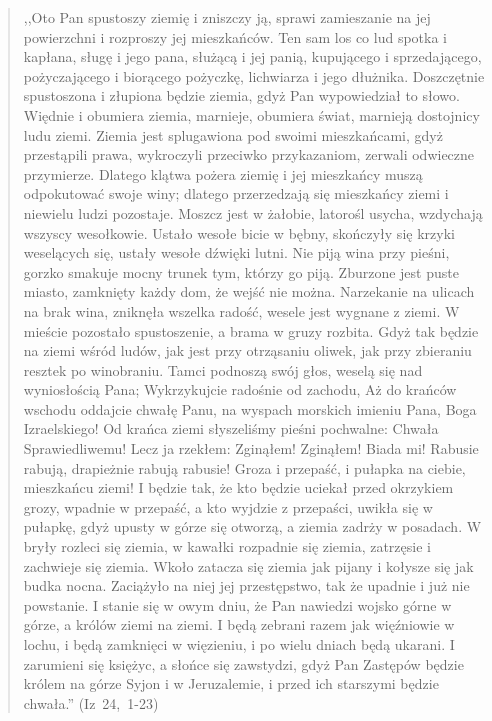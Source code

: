 \documentclass[10pt,a4paper,oneside]{article}
\begin{document}
\begin{quote}
,,Oto Pan spustoszy ziemię i zniszczy ją, sprawi zamieszanie na jej powierzchni i rozproszy jej mieszkańców. Ten sam los co lud spotka i kapłana, sługę i jego pana, służącą i jej panią, kupującego i sprzedającego, pożyczającego i biorącego pożyczkę, lichwiarza i jego dłużnika. Doszczętnie spustoszona i złupiona będzie ziemia, gdyż Pan wypowiedział to słowo. Więdnie i obumiera ziemia, marnieje, obumiera świat, marnieją dostojnicy ludu ziemi. Ziemia jest splugawiona pod swoimi mieszkańcami, gdyż przestąpili prawa, wykroczyli przeciwko przykazaniom, zerwali odwieczne przymierze. Dlatego klątwa pożera ziemię i jej mieszkańcy muszą odpokutować swoje winy; dlatego przerzedzają się mieszkańcy ziemi i niewielu ludzi pozostaje. Moszcz jest w żałobie, latorośl usycha, wzdychają wszyscy wesołkowie. Ustało wesołe bicie w bębny, skończyły się krzyki weselących się, ustały wesołe dźwięki lutni. Nie piją wina przy pieśni, gorzko smakuje mocny trunek tym, którzy go piją. Zburzone jest puste miasto, zamknięty każdy dom, że wejść nie można. Narzekanie na ulicach na brak wina, zniknęła wszelka radość, wesele jest wygnane z ziemi. W mieście pozostało spustoszenie, a brama w gruzy rozbita. Gdyż tak będzie na ziemi wśród ludów, jak jest przy otrząsaniu oliwek, jak przy zbieraniu resztek po winobraniu. Tamci podnoszą swój głos, weselą się nad wyniosłością Pana; Wykrzykujcie radośnie od zachodu, Aż do krańców wschodu oddajcie chwałę Panu, na wyspach morskich imieniu Pana, Boga Izraelskiego! Od krańca ziemi słyszeliśmy pieśni pochwalne: Chwała Sprawiedliwemu! Lecz ja rzekłem: Zginąłem! Zginąłem! Biada mi! Rabusie rabują, drapieżnie rabują rabusie! Groza i przepaść, i pułapka na ciebie, mieszkańcu ziemi! I będzie tak, że kto będzie uciekał przed okrzykiem grozy, wpadnie w przepaść, a kto wyjdzie z przepaści, uwikła się w pułapkę, gdyż upusty w górze się otworzą, a ziemia zadrży w posadach. W bryły rozleci się ziemia, w kawałki rozpadnie się ziemia, zatrzęsie i zachwieje się ziemia. Wkoło zatacza się ziemia jak pijany i kołysze się jak budka nocna. Zaciążyło na niej jej przestępstwo, tak że upadnie i już nie powstanie. I stanie się w owym dniu, że Pan nawiedzi wojsko górne w górze, a królów ziemi na ziemi. I będą zebrani razem jak więźniowie w lochu, i będą zamknięci w więzieniu, i po wielu dniach będą ukarani. I zarumieni się księżyc, a słońce się zawstydzi, gdyż Pan Zastępów będzie królem na górze Syjon i w Jeruzalemie, i przed ich starszymi będzie chwała.'' (Iz~24,~1-23)
\end{quote}
\end{document}

